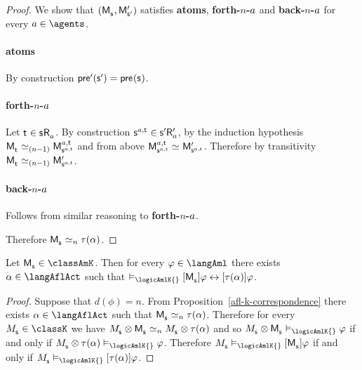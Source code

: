 \begin{proof}
We show that $(\aPModel{\aStateS}, \aPModelP{\aStateSP})$ satisfies {\bf atoms}, {\bf forth-$n$-$a$} and {\bf back-$n$-$a$} for every $\agentA \in \agents$.

\paragraph{atoms} By construction
$\aPreconditionP(\aStateSP) = \aPrecondition(\aStateS)$.

\paragraph{forth-$n$-$a$} 
Let $\aStateT \in \aStateS \aAccessibility{\agentA}$.
By construction $\aStateS[\agentA,\aStateT] \in \aStateSP \aAccessibilityP{\agentA}$, by the induction hypothesis $\aPModel{\aStateT} \bisimilar[(n - 1)] \aPModel[\agentA,\aStateT]{\aStateS[\agentA,\aStateT]}$ and from above $\aPModel[\agentA,\aStateT]{\aStateS[\agentA,\aStateT]} \bisimilar \aPModelP{\aStateS[\agentA,\aStateT]}$.
Therefore by transitivity $\aPModel{\aStateT} \bisimilar[(n - 1)] \aPModelP{\aStateS[\agentA,\aStateT]}$.

\paragraph{back-$n$-$a$} Follows from similar reasoning to {\bf forth-$n$-$a$}.

Therefore $\aPModel{\aStateS} \bisimilar[n] \tau(\alpha)$.
\end{proof}

\begin{corollary}\label{afl-k-correspondence-aml-allacts}
Let $\aPModel{\aStateS} \in \classAmK$.
Then for every $\phi \in \langAml$ there exists $\alpha \in \langAflAct$ such that $\entails_\logicAmlK{} \actionA{\aPModel{\aStateS}} \phi \iff \actionA{\tau(\alpha)} \phi$.
\end{corollary}

\begin{proof}
Suppose that $d(\phi) = n$.
From Proposition~\ref{afl-k-correspondence} there exists $\alpha \in \langAflAct$ such that $\aPModel{\aStateS} \bisimilar[n] \tau(\alpha)$.
Therefore for every $\kPModel{\aStateS} \in \classK$ we have $\kPModel{\aStateS} \exec \aPModel{\aStateS} \bisimilar[n] \kPModel{\aStateS} \exec \tau(\alpha)$ and so $\kPModel{\aStateS} \exec \aPModel{\aStateS} \entails_\logicAmlK{} \phi$ if and only if $\kPModel{\aStateS} \exec \tau(\alpha) \entails_\logicAmlK{} \phi$.
Therefore $\kPModel{\aStateS} \entails_\logicAmlK{} \actionA{\aPModel{\aStateS}}  \phi$ if and only if $\kPModel{\aStateS} \entails_\logicAmlK{} \actionA{\tau(\alpha)}  \phi$.
\end{proof}

